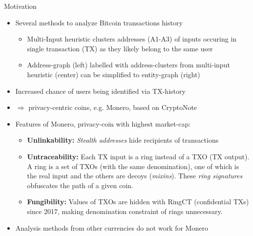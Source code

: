 \begin{columns}[t]\begin{column}{.47\textwidth}
\begin{block}{Motivation}
    \vspace*{-8pt}
    \begin{itemize}
        \item Several methods to analyze Bitcoin transactions history
        \begin{itemize}
            \item
            Multi-Input heuristic clusters addresses (A1-A3) of inputs occuring in single transaction (TX) as they likely belong to the same user
            \vspace*{0.5cm}
            \begin{center}
                
            \end{center}
            \item
            Address-graph (left) labelled with address-clusters from multi-input heuristic (center) can be simplified to entity-graph (right)
            \vspace*{0.5cm}
            \begin{center}
                
            \end{center}
        \end{itemize}
        \item Increased chance of users being identified via TX-history
        \item $\Rightarrow$ privacy-centric coins, e.g. Monero, based on CryptoNote \cite{van_saberhagen_cryptonote_2013}
        \item Features of Monero, privacy-coin with highest market-cap:
        \begin{itemize}
            \item \textbf{Unlinkability:} \emph{Stealth addresses} hide recipients of transactions
            \item \textbf{Untraceability:} Each TX input is a ring instead of a TXO (TX output). A ring is a set of TXOs (with the same denomination), one of which is the real input and the others are decoys (\emph{mixins}). These \emph{ring signatures} obfuscates the path of a given coin.
            \item \textbf{Fungibility:} Values of TXOs are hidden with RingCT (confidential TXs) since 2017, making denomination constraint of rings unnecessary.
        \end{itemize}
        \item Analysis methods from other currencies do not work for Monero
    \end{itemize}
    


\end{block}
\end{column}
\end{columns}
